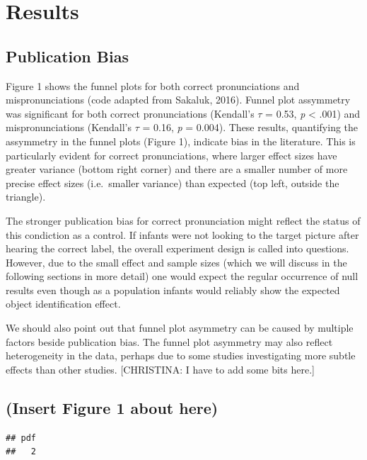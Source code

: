 \documentclass[man]{apa6}
\theoremstyle{definition}
\theoremstyle{definition}
\theoremstyle{definition}
\theoremstyle{remark}
\begin{document}
\section{Results}\label{results}

\subsection{Publication Bias}\label{publication-bias-1}

Figure 1 shows the funnel plots for both correct pronunciations and
mispronunciations (code adapted from Sakaluk, 2016). Funnel plot
assymmetry was significant for both correct pronunciations (Kendall's
\(\tau\) = 0.53, \emph{p} \textless{} .001) and mispronunciations
(Kendall's \(\tau\) = 0.16, \emph{p} = 0.004). These results,
quantifying the assymmetry in the funnel plots (Figure 1), indicate bias
in the literature. This is particularly evident for correct
pronunciations, where larger effect sizes have greater variance (bottom
right corner) and there are a smaller number of more precise effect
sizes (i.e.~smaller variance) than expected (top left, outside the
triangle).

The stronger publication bias for correct pronunciation might reflect
the status of this condiction as a control. If infants were not looking
to the target picture after hearing the correct label, the overall
experiment design is called into questions. However, due to the small
effect and sample sizes (which we will discuss in the following sections
in more detail) one would expect the regular occurrence of null results
even though as a population infants would reliably show the expected
object identification effect.

We should also point out that funnel plot asymmetry can be caused by
multiple factors beside publication bias. The funnel plot asymmetry may
also reflect heterogeneity in the data, perhaps due to some studies
investigating more subtle effects than other studies. {[}CHRISTINA: I
have to add some bits here.{]}

\subsection{(Insert Figure 1 about
here)}\label{insert-figure-1-about-here}

\begin{verbatim}
## pdf 
##   2
\end{verbatim}
\end{document}
